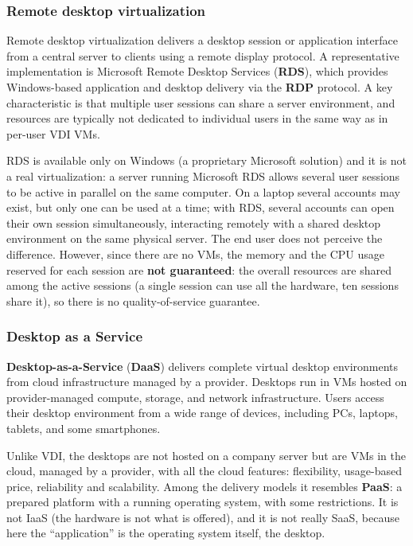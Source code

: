 \subsubsection*{Remote desktop virtualization}

Remote desktop virtualization delivers a desktop session or application interface from a central server to clients using a remote display protocol. A representative implementation is Microsoft Remote Desktop Services (\textbf{RDS}), which provides Windows-based application and desktop delivery via the \textbf{RDP} protocol. A key characteristic is that multiple user sessions can share a server environment, and resources are typically not dedicated to individual users in the same way as in per-user VDI VMs.

RDS is available only on Windows (a proprietary Microsoft solution) and it is not a real virtualization: a server running Microsoft RDS allows several user sessions to be active in parallel on the same computer. On a laptop several accounts may exist, but only one can be used at a time; with RDS, several accounts can open their own session simultaneously, interacting remotely with a shared desktop environment on the same physical server. The end user does not perceive the difference. However, since there are no VMs, the memory and the CPU usage reserved for each session are \textbf{not guaranteed}: the overall resources are shared among the active sessions (a single session can use all the hardware, ten sessions share it), so there is no quality-of-service guarantee.

\subsubsection*{Desktop as a Service}

\textbf{Desktop-as-a-Service} (\textbf{DaaS}) delivers complete virtual desktop environments from cloud infrastructure managed by a provider. Desktops run in VMs hosted on provider-managed compute, storage, and network infrastructure. Users access their desktop environment from a wide range of devices, including PCs, laptops, tablets, and some smartphones.

Unlike VDI, the desktops are not hosted on a company server but are VMs in the cloud, managed by a provider, with all the cloud features: flexibility, usage-based price, reliability and scalability. Among the delivery models it resembles \textbf{PaaS}: a prepared platform with a running operating system, with some restrictions. It is not IaaS (the hardware is not what is offered), and it is not really SaaS, because here the ``application'' is the operating system itself, the desktop.

